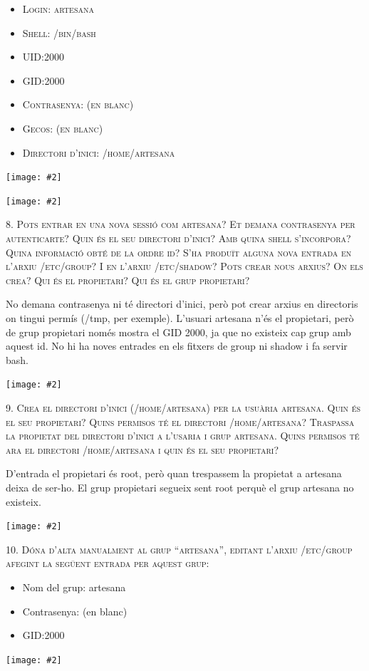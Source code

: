 \documentclass[a4paper,12pt]{article}
\newcommand{\mygraphic}[2][width=\textwidth]{\begin{center}
		\centering\texttt{[image: \#2]}\par
\end{center}}
\begin{document}
\begin{itemize}
\item \textsc{Login: artesana}
\item \textsc{Shell: /bin/bash}
\item \textsc{UID:2000}
\item \textsc{GID:2000}
\item \textsc{Contrasenya: (en blanc)}
\item \textsc{Gecos: (en blanc)}
\item \textsc{Directori d’inici: /home/artesana}
\end{itemize}

\mygraphic{imatges/7a.png}
\mygraphic{imatges/7b.png}

\textsc{8. Pots entrar en una nova sessió com artesana? Et demana contrasenya per autenticarte? Quin és el seu directori d’inici? Amb quina shell s’incorpora? Quina informació obté de la ordre id? S’ha produït alguna nova entrada en l’arxiu /etc/group? I en l’arxiu /etc/shadow? Pots crear nous arxius? On els crea? Qui és el propietari? Qui és el grup propietari?}

No demana contrasenya ni té directori d'inici, però pot crear arxius en directoris on tingui permís (/tmp, per exemple). L'usuari artesana n'és el propietari, però de grup propietari només mostra el GID 2000, ja que no existeix cap grup amb aquest id. No hi ha noves entrades en els fitxers de group ni shadow i fa servir bash.
\mygraphic{imatges/8.png}

\newpage
\textsc{9. Crea el directori d’inici (/home/artesana) per la usuària artesana. Quin és el seu propietari? Quins permisos té el directori /home/artesana? Traspassa la propietat del directori d’inici a l’usaria i grup artesana. Quins permisos té ara el directori /home/artesana i quin és el seu propietari?}

D'entrada el propietari és root, però quan trespassem la propietat a artesana deixa de ser-ho. El grup propietari segueix sent root perquè el grup artesana no existeix.
\mygraphic{imatges/9.png}

\newpage
\textsc{10. Dóna d’alta manualment al grup “artesana”, editant l’arxiu /etc/group afegint la següent entrada per aquest grup:}
\begin{itemize}
	\item Nom del grup: artesana
	\item Contrasenya: (en blanc)
	\item GID:2000
\end{itemize}
\mygraphic{imatges/10a.png}
\end{document}
